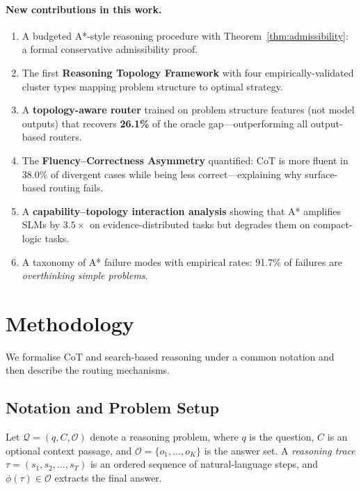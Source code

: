 \documentclass[11pt]{article}
\begin{document}
\paragraph{New contributions in this work.}
\begin{enumerate}[leftmargin=*, itemsep=2pt]
  \item A budgeted A*-style reasoning procedure with Theorem~\ref{thm:admissibility}: a formal conservative admissibility proof.
  \item The first \textbf{Reasoning Topology Framework} with four empirically-validated cluster types mapping problem structure to optimal strategy.
  \item A \textbf{topology-aware router} trained on problem structure features (not model outputs) that recovers \textbf{26.1\%} of the oracle gap—outperforming all output-based routers.
  \item The \textbf{Fluency--Correctness Asymmetry} quantified: CoT is more fluent in 38.0\% of divergent cases while being less correct—explaining why surface-based routing fails.
  \item A \textbf{capability--topology interaction analysis} showing that A* amplifies SLMs by $3.5\times$ on evidence-distributed tasks but degrades them on compact-logic tasks.
  \item A taxonomy of A* failure modes with empirical rates: 91.7\% of failures are \emph{overthinking simple problems}.
\end{enumerate}

\section{Methodology}
\label{sec:method}

We formalise CoT and search-based reasoning under a common notation and then describe the routing mechanisms.

\subsection{Notation and Problem Setup}

Let $\mathcal{Q} = (q, C, \mathcal{O})$ denote a reasoning problem, where $q$ is the question, $C$ is an optional context passage, and $\mathcal{O} = \{o_1, \ldots, o_K\}$ is the answer set. A \emph{reasoning trace} $\tau = (s_1, s_2, \ldots, s_T)$ is an ordered sequence of natural-language steps, and $\phi(\tau) \in \mathcal{O}$ extracts the final answer.
\end{document}
